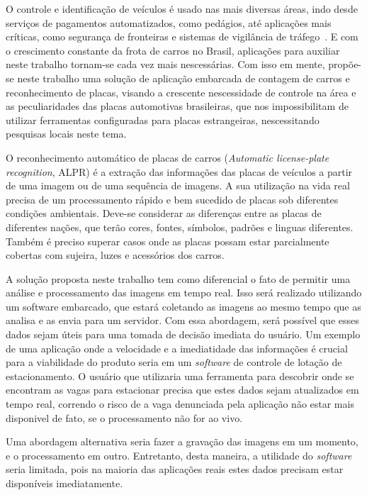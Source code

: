 
O controle e identificação de veículos é usado nas mais diversas áreas, indo
desde serviços de pagamentos automatizados, como pedágios, até aplicações mais
críticas, como segurança de fronteiras e sistemas de vigilância de
tráfego~\cite{ahmad2015automatic}. E com o crescimento constante da frota de
carros no Brasil, aplicações para auxiliar neste trabalho tornam-se cada vez
mais nescessárias. Com isso em mente, propõe-se neste trabalho uma solução de
aplicação embarcada de contagem de carros e reconhecimento de placas, visando a
crescente nescessidade de controle na área e as peculiaridades das placas
automotivas brasileiras, que nos impossibilitam de utilizar ferramentas
configuradas para placas estrangeiras, nescessitando pesquisas locais neste
tema.

O reconhecimento automático de placas de carros (\emph{Automatic license-plate
recognition}, ALPR) é a extração das informações das placas de veículos a partir
de uma imagem ou de uma sequência de imagens. A sua utilização na vida real
precisa de um processamento rápido e bem sucedido de placas sob diferentes
condições ambientais. Deve-se considerar as diferenças entre as placas de
diferentes nações, que terão cores, fontes, símbolos, padrões e linguas
diferentes. Também é preciso superar casos onde as placas possam estar
parcialmente cobertas com sujeira, luzes e acessórios dos
carros.~\cite{s2013automatic}

A solução proposta neste trabalho tem como diferencial o fato de permitir uma
análise e processamento das imagens em tempo real. Isso será realizado
utilizando um software embarcado, que estará coletando as imagens ao mesmo tempo
que as analisa e as envia para um servidor. Com essa abordagem, será possível
que esses dados sejam úteis para uma tomada de decisão imediata do usuário. Um
exemplo de uma aplicação onde a velocidade e a imediatidade das informações é
crucial para a viabilidade do produto seria em um \emph{software} de controle de
lotação de estacionamento. O usuário que utilizaria uma ferramenta para
descobrir onde se encontram as vagas para estacionar precisa que estes dados
sejam atualizados em tempo real, correndo o risco de a vaga denunciada pela
aplicação não estar mais disponivel de fato, se o processamento não for ao vivo.

Uma abordagem alternativa seria fazer a gravação das imagens em um momento, e o
processamento em outro. Entretanto, desta maneira, a utilidade do
\emph{software} seria limitada, pois na maioria das aplicações reais estes dados
precisam estar disponíveis imediatamente.

